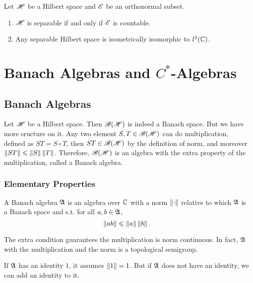 \documentclass[a4paper,11pt]{report}
\begin{document}
\begin{prop}
	Let $\mathscr{H}$ be a Hilbert space and $\mathscr{E}$ be an orthonormal subset.
	\begin{enumerate}[label=\arabic*)]
		\item $\mathscr{H}$ is separable if and only if $\mathscr{E}$ is countable.
		\item Any separable Hilbert space is isometrically isomorphic to $l^{2}(\mathbb{C})$.
	\end{enumerate}
\end{prop}

\chapter{Banach Algebras and \texorpdfstring{$C^{*}$-Algebras}{C*-Algebras}}
\section{Banach Algebras}

Let $\mathscr{H}$ be a Hilbert space. Then $\mathscr{B(H)}$ is indeed a Banach space. But we have more sructure on it. Any two element $S,T \in \mathscr{B(H)}$ can do multiplication, defined as $ST = S \circ T$, then $ST \in \mathscr{B(H)}$ by the definition of norm, and moreover $\left\lVert ST\right\lVert \leqslant \left\lVert S\right\lVert\left\lVert T\right\lVert$. Therefore, $\mathscr{B(H)}$ is an algebra with the extra property of the multiplication, called a Banach algebra.

\subsection{Elementary Properties}

\begin{defn}
	A Banach algebra $\mathfrak{A}$ is an algebra over $\mathbb{C}$ with a norm $\left\lVert\cdot\right\lVert$ relative to which $\mathfrak{A}$ is a Banach space and s.t. for all $a,b \in \mathfrak{A}$,
	\begin{equation*}
		\left\lVert ab\right\lVert \leqslant \left\lVert a\right\lVert\left\lVert b\right\lVert.
	\end{equation*}
\end{defn}
\begin{rem}
	The extra condition guarantees the multiplication is norm continuous. In fact, $\mathfrak{A}$ with the multiplication and the norm is a topological semigroup.
\end{rem}

If $\mathfrak{A}$ has an identity $1$, it assumes $\left\lVert1\right\lVert=1$. But if $\mathfrak{A}$ does not have an identity, we can add an identity to it.
\end{document}
